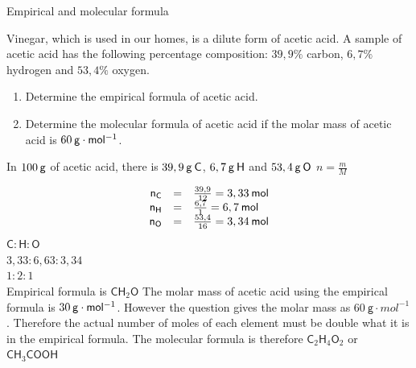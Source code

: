     \noindent
\label{m38712*secfhsst!!!underscore!!!id1308} \vspace{-3cm}
      \noindent 
      \begin{wex}{Empirical and molecular formula
      }
 {
     \label{m38712*probfhsst!!!underscore!!!id1310}
      \label{m38712*id281533}Vinegar, which is used in our homes, is a dilute form of acetic acid. A sample of acetic acid has the following percentage composition: $39,9\%$ carbon, $6,7\%$ hydrogen and $53,4\%$ oxygen.  
      \label{m38712*id281540}\begin{enumerate}[noitemsep, label=\textbf{\arabic*}. ] 
            \leftskip=20pt\rightskip=\leftskip\label{m38712*uid71}\item Determine the empirical formula of acetic acid.
\label{m38712*uid72}\item Determine the molecular formula of acetic acid if the molar mass of acetic acid is $60\phantom{\rule{2pt}{0ex}}\mathsf{g}\ensuremath{\cdot}\mathsf{mol}{}^{-1}$.
\end{enumerate}
      \vspace{5pt}}
{
      \label{m38712*id281607}In $100\phantom{\rule{2pt}{0ex}}\mathsf{g}$ of acetic acid, there is $39,9\phantom{\rule{2pt}{0ex}}\mathsf{g}\phantom{\rule{2pt}{0ex}}\mathsf{C}$, $6,7\phantom{\rule{2pt}{0ex}}\mathsf{g}\phantom{\rule{2pt}{0ex}}\mathsf{H}$ and $53,4\phantom{\rule{2pt}{0ex}}\mathsf{g}\phantom{\rule{2pt}{0ex}}\mathsf{O}$ 
      \label{m38712*id281633}
        $n=\frac{m}{M}$
      
      \label{m38712*id281653}\nopagebreak\noindent{}
        
    \begin{equation*}
    \begin{array}{ccc}\hfill {\mathsf{n}}_{\mathsf{C}}& =& \frac{39,9}{12}=3,33\phantom{\rule{2pt}{0ex}}\mathsf{mol}\hfill \\ \hfill {\mathsf{n}}_{\mathsf{H}}& =& \frac{6,7}{1}=6,7\phantom{\rule{2pt}{0ex}}\mathsf{mol}\hfill \\ \hfill {\mathsf{n}}_{\mathsf{O}}& =& \frac{53,4}{16}=3,34\phantom{\rule{2pt}{0ex}}\mathsf{mol}\hfill \end{array}
      \end{equation*}
      \label{m38712*id281812}
$\mathsf{C}:\mathsf{H}:\mathsf{O}$\\
$3,33:6,63:3,34$ \\
$1:2:1$\\
Empirical formula is $\mathsf{CH}{}_{2}\mathsf{O}$ 
      \label{m38712*id281834}The molar mass of acetic acid using the empirical formula is $30\phantom{\rule{2pt}{0ex}}\mathsf{g}\ensuremath{\cdot}\mathsf{mol}{}^{-1}$. However the question gives the molar mass as $60~\mathsf{g}\cdot{mol}^{-1}$. Therefore the actual number of moles of each element must be double what it is in the empirical formula.
      \label{m38712*id281854}The molecular formula is therefore $\mathsf{C}{}_{2}\mathsf{H}{}_{4}\mathsf{O}{}_{2}$ or $\mathsf{CH}{}_{3}\mathsf{COOH}$
}
    \end{wex}
